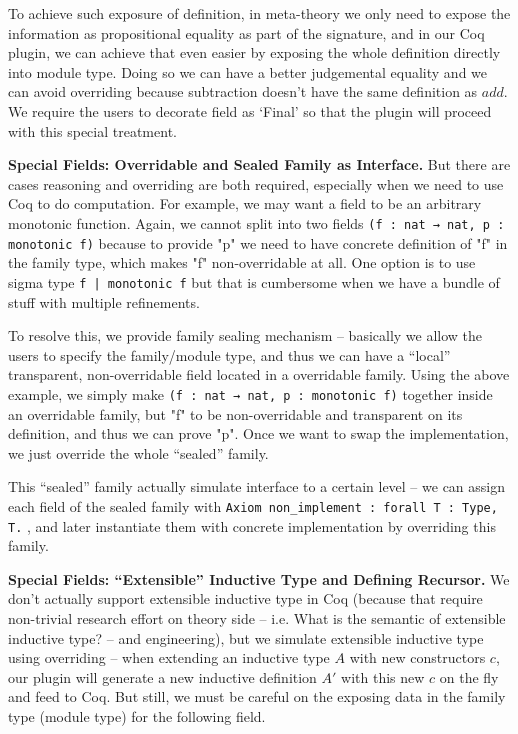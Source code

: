 To achieve such exposure of definition, in meta-theory we only need to expose the information as propositional equality as part of the signature, and in our Coq plugin, we can achieve that even easier by exposing the whole definition directly into module type. Doing so we can have a better judgemental equality and we can avoid overriding because subtraction doesn't have the same definition as $add$. We require the users to decorate field as `Final' so that the plugin will proceed with this special treatment.

\textbf{Special Fields: Overridable and Sealed Family as Interface.}
But there are cases reasoning and overriding are both required, especially when we need to use Coq to do computation. For example, we may want a field to be an arbitrary monotonic function. Again, we cannot split into two fields \texttt{(f : nat → nat, p : monotonic f)} because to provide "p" we need to have concrete definition of "f" in the family type, which makes "f" non-overridable at all. One option is to use sigma type \texttt{{f | monotonic f}} but that is cumbersome when we have a bundle of stuff with multiple refinements. 

To resolve this, we provide family sealing mechanism -- basically we allow the users to specify the family/module type, and thus we can have a ``local'' transparent, non-overridable field located in a overridable family. Using the above example, we simply make \texttt{(f : nat → nat, p : monotonic f)} together inside an overridable family, but "f" to be non-overridable and transparent on its definition, and thus we can prove "p". Once we want to swap the implementation, we just override the whole ``sealed'' family. 

This ``sealed'' family actually simulate interface to a certain level -- we can assign each field of the sealed family with \texttt{Axiom non_implement : forall {T : Type}, T.}  , and later instantiate them with concrete implementation by overriding this family.



\textbf{Special Fields: ``Extensible'' Inductive Type and Defining Recursor.}
We don't actually support extensible inductive type in Coq (because that require non-trivial research effort on theory side -- i.e. {What is the semantic of extensible inductive type?} -- and engineering), but we simulate extensible inductive type using overriding -- when extending an inductive type $A$ with new constructors $c$, our plugin will generate a new inductive definition $A'$ with this new $c$ on the fly and feed to Coq.  But still, we must be careful on the exposing data in the family type (module type) for the following field.  

